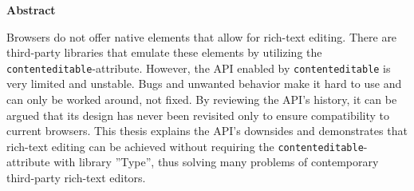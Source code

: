 \thispagestyle{empty}
\noindent \textbf{Abstract}

\noindent Browsers do not offer native elements that allow for rich-text editing. There are third-party libraries that emulate these elements by utilizing the \texttt{contenteditable}-attribute. However, the API enabled by \texttt{contenteditable} is very limited and unstable. Bugs and unwanted behavior make it hard to use and can only be worked around, not fixed. By reviewing the API's history, it can be argued that its design has never been revisited only to ensure compatibility to current browsers. This thesis explains the API's downsides and demonstrates that rich-text editing can be achieved without requiring the \texttt{contenteditable}-attribute with library ''Type'', thus solving many problems of contemporary third-party rich-text editors.
